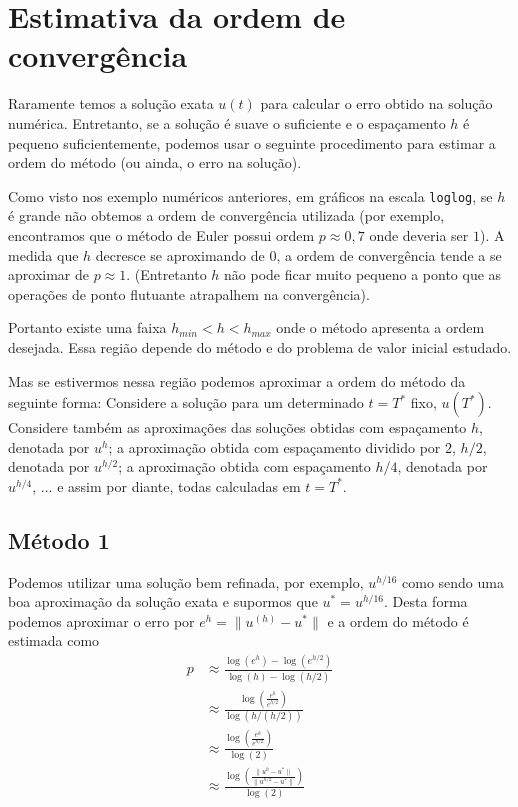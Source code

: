 \section{Estimativa da ordem de convergência}

Raramente temos a solução exata $u(t)$ para calcular o erro obtido na solução numérica. Entretanto, se a solução é suave o suficiente e o espaçamento $h$ é pequeno suficientemente, podemos usar o seguinte procedimento para estimar a ordem do método (ou ainda, o erro na solução).

Como visto nos exemplo numéricos anteriores, em gráficos na escala \verb#loglog#, se $h$ é grande não obtemos a ordem de convergência utilizada (por exemplo, encontramos que o método de Euler possui ordem $p\approx 0,7$ onde deveria ser $1$). A medida que $h$ decresce se aproximando de $0$, a ordem de convergência tende a se aproximar de $p\approx 1$. (Entretanto $h$ não pode ficar muito pequeno a ponto que as operações de ponto flutuante atrapalhem na convergência).

Portanto existe uma faixa $h_{min} < h < h_{max}$ onde o método apresenta a ordem desejada. Essa região depende do método e do problema de valor inicial estudado.

Mas se estivermos nessa região podemos aproximar a ordem do método da seguinte forma: Considere a solução para um determinado $t=T^*$ fixo, $u(T^*)$. Considere também as aproximações das soluções obtidas com espaçamento $h$, denotada por $u^{h}$; a aproximação obtida com espaçamento dividido por $2$, $h/2$, denotada por $u^{h/2}$; a aproximação obtida com espaçamento $h/4$, denotada por $u^{h/4}$, $\ldots $ e assim por diante, todas calculadas em $t=T^*$.

\subsection{Método 1}
Podemos utilizar uma solução bem refinada, por exemplo, $u^{h/16}$ como sendo uma boa aproximação da solução exata e supormos que $u^*=u^{h/16}$. Desta forma podemos aproximar o erro por $e^{h}=\|u^{(h)}-u^*\|$ e a ordem do método é estimada como
\begin{eqnarray}
  p  & \approx  \frac{ \log(e^{h})-\log(e^{h/2})}{\log(h)-\log(h/2)} \\
     & \approx  \frac{ \log \left(   \frac{e^{h}}{e^{h/2}} \right)  }{\log(h /(h/2))} \\
     & \approx  \frac{ \log \left(   \frac{e^{h}}{e^{h/2}} \right)  }{\log(2)} \\
     & \approx  \frac{ \log \left(   \frac{\|u^{h}-u^*\|}{\|u^{h/2}-u^*\|} \right)  }{\log(2)} \\
\end{eqnarray}

